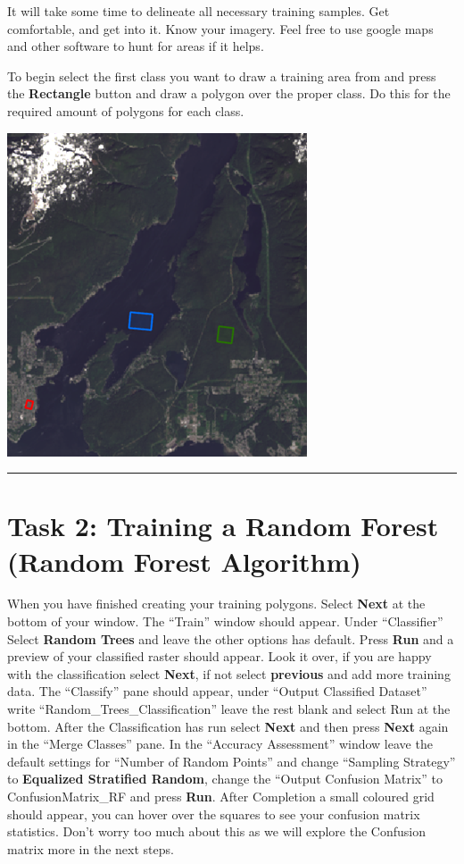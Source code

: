 \documentclass[
]{book}
\begin{document}
It will take some time to delineate all necessary training samples. Get comfortable, and get into it. Know your imagery. Feel free to use google maps and other software to hunt for areas if it helps.

To begin select the first class you want to draw a training area from and press the \textbf{Rectangle} button and draw a polygon over the proper class. Do this for the required amount of polygons for each class.

\begin{center}\includegraphics[width=0.5\linewidth]{images/08-rectangle-training-areas} \end{center}

\begin{center}\rule{0.5\linewidth}{0.5pt}\end{center}

\hypertarget{task-2-training-a-random-forest-random-forest-algorithm}{%
\section*{Task 2: Training a Random Forest (Random Forest Algorithm)}\label{task-2-training-a-random-forest-random-forest-algorithm}}

When you have finished creating your training polygons. Select \textbf{Next} at the bottom of your window. The ``Train'' window should appear. Under ``Classifier'' Select \textbf{Random Trees} and leave the other options has default. Press \textbf{Run} and a preview of your classified raster should appear. Look it over, if you are happy with the classification select \textbf{Next}, if not select \textbf{previous} and add more training data. The ``Classify'' pane should appear, under ``Output Classified Dataset'' write ``Random\_Trees\_Classification'' leave the rest blank and select Run at the bottom. After the Classification has run select \textbf{Next} and then press \textbf{Next} again in the ``Merge Classes'' pane. In the ``Accuracy Assessment'' window leave the default settings for ``Number of Random Points'' and change ``Sampling Strategy'' to \textbf{Equalized Stratified Random}, change the ``Output Confusion Matrix'' to ConfusionMatrix\_RF and press \textbf{Run}. After Completion a small coloured grid should appear, you can hover over the squares to see your confusion matrix statistics. Don't worry too much about this as we will explore the Confusion matrix more in the next steps.
\end{document}
